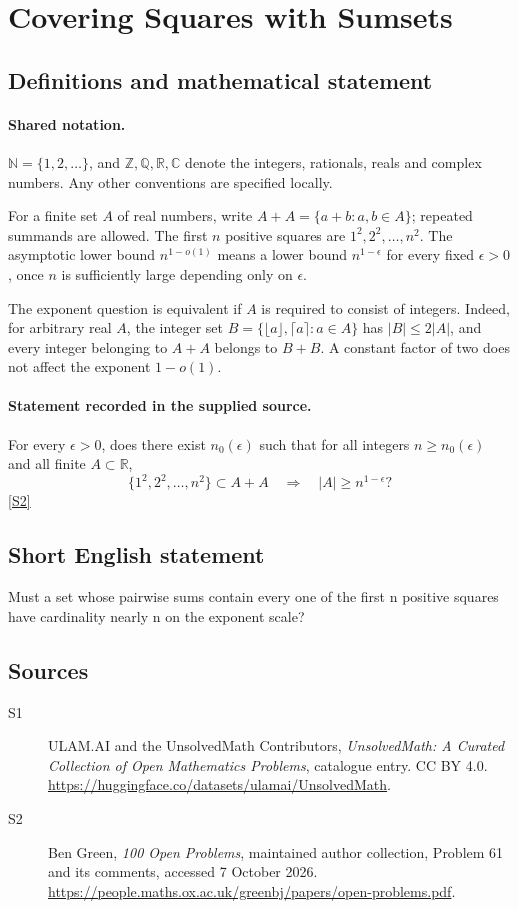 \documentclass[11pt]{article}
\newcommand{\sref}[2]{\hyperlink{source:#1:#2}{[S#2]}}
\begin{document}
\section{Covering Squares with Sumsets}\label{statement}

\subsection{Definitions and mathematical statement}

\paragraph{Shared notation.}$\mathbb N=\{1,2,\ldots\}$, and $\mathbb Z,\mathbb Q,\mathbb R,\mathbb C$ denote the integers, rationals, reals and complex numbers. Any other conventions are specified locally.


For a finite set $A$ of real numbers, write $A+A=\{a+b:a,b\in A\}$; repeated summands are allowed. The first $n$ positive squares are $1^2,2^2,\ldots,n^2$. The asymptotic lower bound $n^{1-o(1)}$ means a lower bound $n^{1-\epsilon}$ for every fixed $\epsilon>0$, once $n$ is sufficiently large depending only on $\epsilon$.

The exponent question is equivalent if $A$ is required to consist of integers. Indeed, for arbitrary real $A$, the integer set $B=\{\lfloor a\rfloor,\lceil a\rceil:a\in A\}$ has $|B|\leq2|A|$, and every integer belonging to $A+A$ belongs to $B+B$. A constant factor of two does not affect the exponent $1-o(1)$.
\paragraph{Statement recorded in the supplied source.}
For every $\epsilon>0$, does there exist $n_0(\epsilon)$ such that for all integers $n\geq n_0(\epsilon)$ and all finite $A\subset\mathbb R$,
\[
 \{1^2,2^2,\ldots,n^2\}\subset A+A
 \quad\Longrightarrow\quad |A|\geq n^{1-\epsilon}?
\] \sref{statement}{2}
\subsection{Short English statement}
Must a set whose pairwise sums contain every one of the first n positive squares have cardinality nearly n on the exponent scale?
\subsection{Sources}
\begin{description}
\item[\hypertarget{source:statement:1}{S1}] ULAM.AI and the UnsolvedMath Contributors, \emph{UnsolvedMath: A Curated Collection of Open Mathematics Problems}, catalogue entry. CC BY 4.0. \url{https://huggingface.co/datasets/ulamai/UnsolvedMath}.
\item[\hypertarget{source:statement:2}{S2}] Ben Green, \emph{100 Open Problems}, maintained author collection, Problem 61 and its comments, accessed 7 October 2026. \url{https://people.maths.ox.ac.uk/greenbj/papers/open-problems.pdf}.
\end{description}
\label{end:statement}
\end{document}
